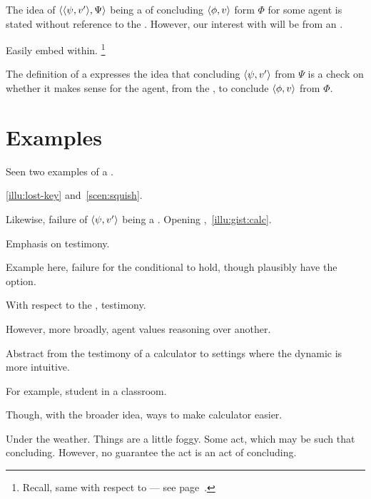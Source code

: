 \begin{note}
  The idea of \(\langle \langle \psi, v' \rangle, \Psi \rangle\) being a  of concluding \(\langle \phi, v \rangle\) form \(\Phi\) for some agent is stated without reference to the \agpe{}.
  However, our interest with  will be from an \agpe{}.

  Easily embed within.%
  \footnote{
    Recall, same with respect to  --- see page~\pageref{fcs-neutral-perspective}.
  }
\end{note}



\begin{note}
  \color{red}
  The definition of a \curb{} expresses the idea that concluding \(\langle \psi, v' \rangle\) from \(\Psi\) is a check on whether it makes sense for the agent, from the \agpe{}, to conclude \(\langle \phi, v \rangle\) from \(\Phi\).
\end{note}

\section{Examples}
\label{cha:zS:sec:curbs:examples}

\begin{note}
  Seen two examples of a \curb{}.

  \autoref{illu:lost-key} and~\autoref{scen:squish}.
\end{note}

\begin{note}[Calculator]
  Likewise, failure of \(\langle \psi, v' \rangle\) being a \curb{}.
  Opening \scen{},~\autoref{illu:gist:calc}.

  Emphasis on testimony.

  Example here, failure for the conditional to hold, though plausibly have the option.

  With respect to the , testimony.

  However, more broadly, agent values reasoning over another.

  Abstract from the testimony of a calculator to settings where the dynamic is more intuitive.

  For example, student in a classroom.

  Though, with the broader idea, ways to make calculator easier.

  Under the weather.
  Things are a little foggy.
  Some act, which may be such that concluding.
  However, no guarantee the act is an act of concluding.
\end{note}

